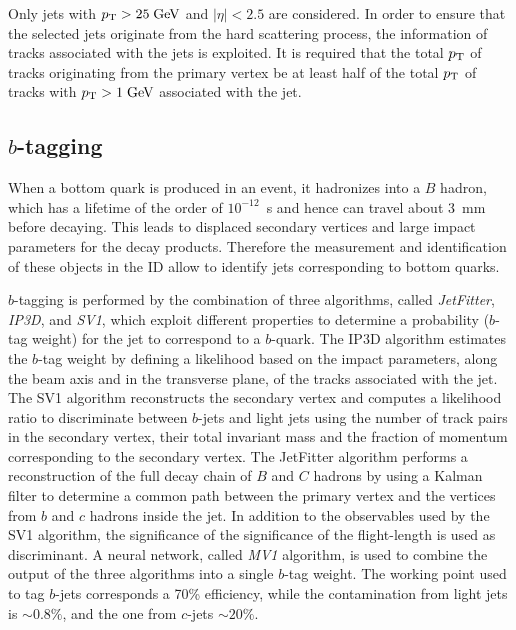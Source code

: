 Only jets with $p_{\mathrm{T}}{}>25 \; \mathrm{GeV}{}$ and $|\eta|<2.5$ are considered. In
order to ensure that the selected jets originate from the hard
scattering process, the information of tracks associated with the jets
is exploited.
It is required that the total $p_{\mathrm{T}}{}$ of tracks originating from the
primary vertex be at least half of the total $p_{\mathrm{T}}$ of tracks with
$p_{\mathrm{T}}{}>1\; \mathrm{GeV}{}$ associated with the jet.

\subsection{$b$-tagging}
\label{sec:btag}

When a bottom quark is produced in an event, it hadronizes into a $B$
hadron, which has a lifetime of the order of $10^{-12}$~s and hence
can travel about 3~mm before decaying.
This leads to displaced secondary vertices and large impact parameters
for the decay products. Therefore the measurement and identification
of these objects in the ID allow to identify jets corresponding to
bottom quarks.

$b$-tagging is performed by the combination of three algorithms,
called {\it JetFitter}, {\it IP3D}, and {\it SV1}, which exploit
different properties to determine a probability ($b$-tag weight) for
the jet to correspond to a $b$-quark.
The IP3D algorithm estimates the $b$-tag weight by defining a
likelihood based on the impact parameters, along the beam axis and in
the transverse plane, of the tracks associated with the jet.
The SV1 algorithm reconstructs the secondary vertex and computes a
likelihood ratio to discriminate between $b$-jets and light jets using
the number of track pairs in the secondary vertex, their total
invariant mass and the fraction of momentum corresponding to the
secondary vertex.
The JetFitter algorithm performs a reconstruction of the full decay
chain of $B$ and $C$ hadrons by using a Kalman filter to determine a
common path between the primary vertex and the vertices from $b$ and
$c$ hadrons inside the jet. In addition to the observables used by the
SV1 algorithm, the significance of the significance of the
flight-length is used as discriminant.
A neural network, called {\it MV1} algorithm, is used to combine the
output of the three algorithms into a single $b$-tag weight.
The working point used to tag $b$-jets corresponds a 70\% efficiency,
while the contamination from light jets is $\sim0.8\%$, and the one
from $c$-jets $\sim20\%$.

